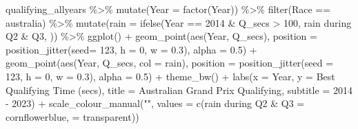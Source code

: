 \documentclass[
]{book}
\newenvironment{Shaded}{\begin{snugshade}}{\end{snugshade}}
\newcommand{\AttributeTok}[1]{\textcolor[rgb]{0.77,0.63,0.00}{#1}}
\newcommand{\DecValTok}[1]{\textcolor[rgb]{0.00,0.00,0.81}{#1}}
\newcommand{\FloatTok}[1]{\textcolor[rgb]{0.00,0.00,0.81}{#1}}
\newcommand{\FunctionTok}[1]{\textcolor[rgb]{0.00,0.00,0.00}{#1}}
\newcommand{\NormalTok}[1]{#1}
\newcommand{\OtherTok}[1]{\textcolor[rgb]{0.56,0.35,0.01}{#1}}
\newcommand{\SpecialCharTok}[1]{\textcolor[rgb]{0.00,0.00,0.00}{#1}}
\newcommand{\StringTok}[1]{\textcolor[rgb]{0.31,0.60,0.02}{#1}}
\begin{document}
\begin{Shaded}
\begin{Highlighting}[]
\NormalTok{qualifying\_allyears }\SpecialCharTok{\%\textgreater{}\%}
  \FunctionTok{mutate}\NormalTok{(}\AttributeTok{Year =} \FunctionTok{factor}\NormalTok{(Year)) }\SpecialCharTok{\%\textgreater{}\%}
  \FunctionTok{filter}\NormalTok{(Race }\SpecialCharTok{==} \StringTok{\textquotesingle{}australia\textquotesingle{}}\NormalTok{) }\SpecialCharTok{\%\textgreater{}\%}
  \FunctionTok{mutate}\NormalTok{(}\AttributeTok{rain =} \FunctionTok{ifelse}\NormalTok{(Year }\SpecialCharTok{==} \StringTok{\textquotesingle{}2014\textquotesingle{}} \SpecialCharTok{\&}\NormalTok{ Q\_secs }\SpecialCharTok{\textgreater{}} \DecValTok{100}\NormalTok{, }\StringTok{\textquotesingle{}rain during Q2 \& Q3\textquotesingle{}}\NormalTok{, }\StringTok{\textquotesingle{} \textquotesingle{}}\NormalTok{)) }\SpecialCharTok{\%\textgreater{}\%} 
  \FunctionTok{ggplot}\NormalTok{() }\SpecialCharTok{+}
  \FunctionTok{geom\_point}\NormalTok{(}\FunctionTok{aes}\NormalTok{(Year, Q\_secs),}
             \AttributeTok{position =} \FunctionTok{position\_jitter}\NormalTok{(}\AttributeTok{seed=} \DecValTok{123}\NormalTok{, }\AttributeTok{h =} \DecValTok{0}\NormalTok{, }\AttributeTok{w =} \FloatTok{0.3}\NormalTok{), }\AttributeTok{alpha =} \FloatTok{0.5}\NormalTok{) }\SpecialCharTok{+}
  \FunctionTok{geom\_point}\NormalTok{(}\FunctionTok{aes}\NormalTok{(Year, Q\_secs, }\AttributeTok{col =}\NormalTok{ rain), }
             \AttributeTok{position =} \FunctionTok{position\_jitter}\NormalTok{(}\AttributeTok{seed =} \DecValTok{123}\NormalTok{, }\AttributeTok{h =} \DecValTok{0}\NormalTok{, }\AttributeTok{w =} \FloatTok{0.3}\NormalTok{), }\AttributeTok{alpha =} \FloatTok{0.5}\NormalTok{) }\SpecialCharTok{+}
  \FunctionTok{theme\_bw}\NormalTok{() }\SpecialCharTok{+}
  \FunctionTok{labs}\NormalTok{(}\AttributeTok{x =} \StringTok{\textquotesingle{}Year\textquotesingle{}}\NormalTok{,}
       \AttributeTok{y =} \StringTok{\textquotesingle{}Best Qualifying Time (secs)\textquotesingle{}}\NormalTok{,}
       \AttributeTok{title =} \StringTok{\textquotesingle{}Australian Grand Prix Qualifying\textquotesingle{}}\NormalTok{,}
       \AttributeTok{subtitle =} \StringTok{\textquotesingle{}2014 {-} 2023\textquotesingle{}}\NormalTok{) }\SpecialCharTok{+}
  \FunctionTok{scale\_colour\_manual}\NormalTok{(}\StringTok{""}\NormalTok{, }\AttributeTok{values =} \FunctionTok{c}\NormalTok{(}\StringTok{\textquotesingle{}rain during Q2 \& Q3\textquotesingle{}} \OtherTok{=} \StringTok{\textquotesingle{}cornflowerblue\textquotesingle{}}\NormalTok{, }\StringTok{\textquotesingle{} \textquotesingle{}} \OtherTok{=} \StringTok{\textquotesingle{}transparent\textquotesingle{}}\NormalTok{))}
\end{Highlighting}
\end{Shaded}
\end{document}
